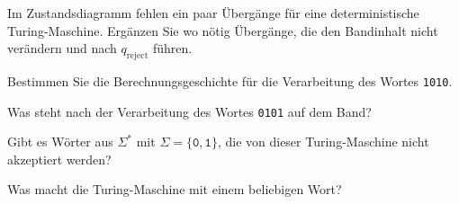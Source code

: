\begin{center}
\end{center}
\begin{teilaufgaben}
\item
Im Zustandsdiagramm fehlen ein paar Übergänge für eine deterministische
Turing-Maschine.
Ergänzen Sie wo nötig Übergänge, die den Bandinhalt nicht verändern und
nach $q_{\text{reject}}$ führen.
\item
Bestimmen Sie die Berechnungsgeschichte für die Verarbeitung des Wortes
\texttt{1010}.
\item
Was steht nach der Verarbeitung des Wortes \texttt{0101} auf dem Band?
\item
Gibt es Wörter aus $\Sigma^*$ mit $\Sigma = \{\texttt{0},\texttt{1}\}$, die
von dieser Turing-Maschine nicht akzeptiert werden?
\item
Was macht die Turing-Maschine mit einem beliebigen Wort?
\end{teilaufgaben}

